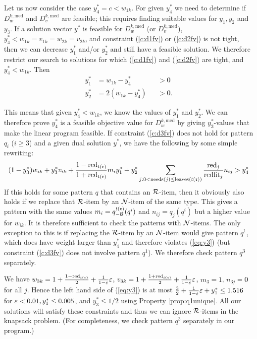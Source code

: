 Let us now consider the case 
$y_4^* = c < w_{1k}.
$ For given $y_4^*$ we need to determine if $D^{k,\text{med}}_w$ and $D^{k,\text{med}}_v$ are feasible; this requires finding suitable values for $y_1, y_2$ and $y_3$. If a solution vector $y^*$ is feasible for $D^{k,\text{med}}_w$ (or $D^{k,\text{med}}_v$), 
$y_4^*< w_{1k}=v_{1k}=w_{2k}=v_{2k}$, and constraint (\ref{c:d1fv}) or (\ref{c:d2fv}) is not tight, then we can decrease $y_1^*$ and/or $y_2^*$ and still have a feasible solution.
We therefore restrict our search to
solutions for which (\ref{c:d1fv}) and (\ref{c:d2fv}) are tight, and $y_4^*< w_{1k}$.
Then 
\begin{align}
\label{eq:y1}
y_1^* &= w_{1k} - y_4^* &&> 0\\
\label{eq:y2}
y_2^* &= 2(w_{1k}-y_4^*) &&>   0.
\end{align}

This means that given $y_4^* < w_{1k}$, we know the values of $y_1^*$ and $y_2^*$. 
We can therefore prove $y^*_4$ is a feasible objective value for $D^{k,\text{med}}_w$ {by giving $y_3^*$-values that make the linear program feasible.} 
If constraint (\ref{c:d3fv}) does not hold for pattern $q_i$ ($i\ge3$) and a given dual solution $y^*$, we have the
following by some simple rewriting:
\begin{equation}
\label{eq:y3}
(1-y_3^*)w_{ik} + y_3^* v_{ik} + \frac{1-\mathrm{red}_{t(\mathfrak{r})}}{1+\mathrm{red}_{t(\mathfrak{r})}} m_i y_1^* + y_2^* \sum_{j:0<\mathrm{needs}(j)\le \mathrm{leaves}({t(\mathfrak{r})})} \frac{\mathrm{red}_j }{\mathrm{redfit}_j} n_{ij} > y_4^*
\end{equation}
If this holds for some pattern $q$ that contains an $\mathcal{R}$-item, then it obviously also holds 
if we replace that $\mathcal{R}$-item by an $\mathcal{N}$-item of the same type.
This gives a pattern with the same values $m_i = q^{t(\mathfrak{r})}_{-\mathcal{B}}(q^i)$ and $n_{ij}=q_j(q^i)$ but a higher value for $w_{ik}$.
It is therefore sufficient to check the patterns with $\mathcal{N}$-items.
The only exception to this is if replacing the $\mathcal{R}$-item by an $\mathcal{N}$-item would give pattern $q^1$, which does have weight
larger than $y_4^*$ and therefore violates (\ref{eq:y3}) (but constraint (\ref{c:d3fv}) does not involve pattern $q^1$).
We therefore check pattern $q^3$ separately.

We have $w_{3k} = 1 + \frac{1-\mathrm{red}_{t(\mathfrak{r})}}2 + \frac{1}{1-\varepsilon} \varepsilon$, 
$v_{3k} = 1 + \frac{1+\mathrm{red}_{t(\mathfrak{r})}}2 + \frac{1}{1-\varepsilon} \varepsilon$,
$m_3=1$, $n_{3j}=0$ for all $j$.
Hence the left hand side of (\ref{eq:y3}) is at most $\frac32 + \frac{1}{1-\varepsilon} \varepsilon + y_1^* \le 1.516$ for $\varepsilon<0.01,
y_1^*\le0.005$, and $y_3^*\le1/2$
using Property \ref{prop:q1unique}.
All our solutions will satisfy these constraints and thus we can ignore $\mathcal{R}$-items in the knapsack problem.
(For completeness, we check pattern $q^3$ separately in our program.)



